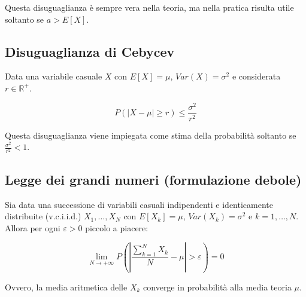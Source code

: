 \documentclass{subfiles}
\begin{document}
\noindent
Questa disuguaglianza è sempre vera nella teoria, ma nella pratica risulta utile soltanto se $a > E[X]$.

\subsection{Disuguaglianza di Cebycev}

Data una variabile casuale $X$ con $E[X]=\mu$, $Var(X)=\sigma^2$ e considerata $r \in \mathbb{R}^+$.

$$
P(|X - \mu| \geq r) \leq \frac{\sigma^2}{r^2}
$$

\noindent
Questa disuguaglianza viene impiegata come stima della probabilità soltanto se $\frac{\sigma^2}{r^2} < 1$.

\subsection{Legge dei grandi numeri (formulazione debole)}

Sia data una successione di variabili casuali indipendenti e identicamente distribuite (v.c.i.i.d.) $X_1, \dots, X_N$ con $E[X_k]=\mu$, $Var(X_k)=\sigma^2$ e $k = 1,\dots,N$.
Allora per ogni $\varepsilon > 0$ piccolo a piacere:

$$
\lim_{N\to+\infty}P(|\frac{\sum^N_{k=1}X_k}{N} - \mu| > \varepsilon) = 0
$$

\noindent
Ovvero, la media aritmetica delle $X_k$ converge in probabilità alla media teoria $\mu$.
\end{document}
